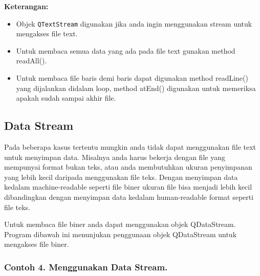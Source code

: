 \textbf{Keterangan:}

\begin{itemize}
\tightlist
\item
  Objek \texttt{QTextStream} digunakan jika anda ingin menggunakan
  stream untuk mengakses file text.
\item
  Untuk membaca semua data yang ada pada file text gunakan method
  readAll().
\item
  Untuk membaca file baris demi baris dapat digunakan method readLine()
  yang dijalankan didalam loop, method atEnd() digunakan untuk memeriksa
  apakah sudah sampai akhir file.
\end{itemize}

\subsection{Data Stream}\label{data-stream}

Pada beberapa kasus tertentu mungkin anda tidak dapat menggunakan file
text untuk menyimpan data. Misalnya anda harus bekerja dengan file yang
mempunyai format bukan teks, atau anda membutuhkan ukuran penyimpanan
yang lebih kecil daripada menggunakan file teks. Dengan menyimpan data
kedalam machine-readable seperti file biner ukuran file bisa menjadi
lebih kecil dibandingkan dengan menyimpan data kedalam human-readable
format seperti file teks.

Untuk membaca file biner anda dapat menggunakan objek QDataStream.
Program dibawah ini menunjukan penggunaan objek QDataStream untuk
mengakses file biner.

\subsubsection*{Contoh 4. Menggunakan Data Stream.}

